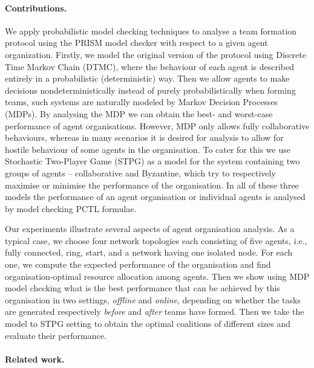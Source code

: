 \documentclass{llncs}
\newcommand{\comment}[1]{{\color{red}{[\sf #1]}}}
\begin{document}
\paragraph{Contributions.} We apply probabilistic model checking techniques to analyse a team
formation protocol \cite{gaston2005agent} using the PRISM model checker \cite{KNP11} with respect to
a given agent organization. Firstly, we model the original version of the protocol using Discrete Time Markov Chain (DTMC), where the behaviour of each agent is described entirely in a probabilistic (deterministic) way. Then we allow agents to make decisions nondeterministically instead of purely probabilistically when forming teams, such systems are naturally modeled by Markov Decision Processes (MDPs). By analysing the MDP we can obtain the best- and worst-case performance of agent organisations. However, MDP only allows fully collaborative behaviours, whereas in many scenarios it is desired for analysis to allow for hostile behaviour of some agents in the organisation. To cater for this we use Stochastic Two-Player Game (STPG) as a model for the system containing two groups of agents -- collaborative and Byzantine, which try to respectively maximise or minimise the performance of the organisation. In all of these three models the performance of an agent organisation or individual agents is analysed by model checking PCTL formulae.

Our experiments illustrate several aspects of agent organisation analysis. As a typical case, we choose four network topologies each consisting of five agents, i.e., fully connected, ring, start, and a network having one isolated node. For each one, we compute the expected performance of the organisation and find organisation-optimal resource allocation among agents. Then we show using MDP model checking what is the best performance that can be achieved by this organisation in two settings, \emph{offline} and \emph{online}, depending on whether the tasks are generated respectively \emph{before} and \emph{after} teams have formed. Then we take the model to STPG setting to obtain the optimal coalitions of different sizes and evaluate their performance.

\comment{resource v.s. skill?}

\comment{add several advantages of our approach - base on results. }




\paragraph{Related work.}
\end{document}
